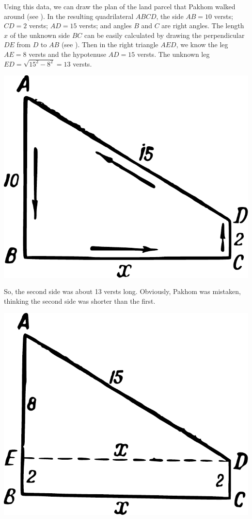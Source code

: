 Using this data, we can draw the plan of the land parcel that Pakhom walked around (see ). In the resulting quadrilateral $ABCD$, the side $AB = 10$ versts; $CD = 2$ versts; $AD = 15$ versts; and angles $B$ and $C$ are right angles. The length $x$ of the unknown side $BC$ can be easily calculated by drawing the perpendicular $DE$ from $D$ to $AB$ (see ). Then in the right triangle $AED$, we know the leg $AE = 8$ versts and the hypotenuse $AD = 15$ versts. The unknown leg $ED = \sqrt{15^{2} - 8^{2}} = 13$ versts.
\begin{marginfigure}[-2cm]%
\centering
\includegraphics[width=\textwidth]{figures/ch-12/fig-175.pdf}
\end{marginfigure}


So, the second side was about 13 versts long. Obviously, Pakhom was mistaken, thinking the second side was shorter than the first.

\begin{marginfigure}[2cm]%
\centering
\includegraphics[width=\textwidth]{figures/ch-12/fig-176.pdf}
\end{marginfigure}

